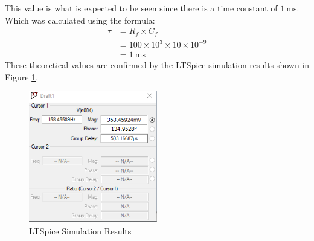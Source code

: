 \documentclass[12pt]{article}
\begin{document}
This value is what is expected to be seen since there is a time constant of
$\SI{1}{\milli\second}$. Which was calculated using the formula:
\[
  \begin{aligned}
    \tau & = R_f \times C_f \\
    & = 100 \times 10^3 \times 10 \times 10^{-9} \\
    & = \SI{1}{\milli\second}
  \end{aligned}
\]
These theoretical values are confirmed by the LTSpice simulation results shown in Figure \ref{fig:1.2Results}.
\begin{figure}[H]
  \centering
  \includegraphics[width=0.5\textwidth]{Lab 10 Shared/1.2 simulation results.PNG}
  \caption{LTSpice Simulation Results}
  \label{fig:1.2Results}
\end{figure}
\end{document}

